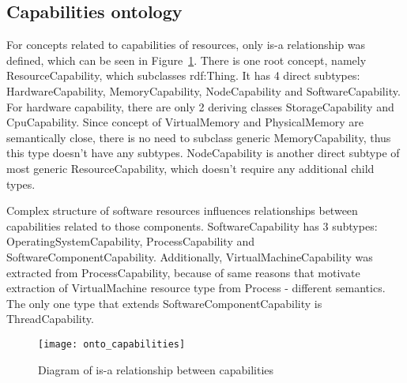\pagebreak

\subsection{Capabilities ontology}
\label{subsec:arch_knowledge_capabilitie}

For concepts related to capabilities of resources, only is-a relationship was defined, which can be seen in Figure~\ref{fig:onto_capabilities}. There is one root concept, namely ResourceCapability, which subclasses rdf:Thing. It has 4 direct subtypes: HardwareCapability, MemoryCapability, NodeCapability and SoftwareCapability. For hardware capability, there are only 2 deriving classes StorageCapability and CpuCapability. Since concept of VirtualMemory and PhysicalMemory are semantically close, there is no need to subclass generic MemoryCapability, thus this type doesn't have any subtypes. NodeCapability is another direct subtype of most generic ResourceCapability, which doesn't require any additional child types. 

Complex structure of software resources influences relationships between capabilities related to those components. SoftwareCapability has 3 subtypes: OperatingSystemCapability, ProcessCapability and SoftwareComponentCapability. Additionally, VirtualMachineCapability was extracted from ProcessCapability, because of same reasons that motivate extraction of VirtualMachine resource type from Process - different semantics. The only one type that extends SoftwareComponentCapability is ThreadCapability.

\begin{figure}[ht]
\centering
\texttt{[image: onto\_capabilities]}
\caption{Diagram of is-a relationship between capabilities}
\label{fig:onto_capabilities}
\end{figure}

